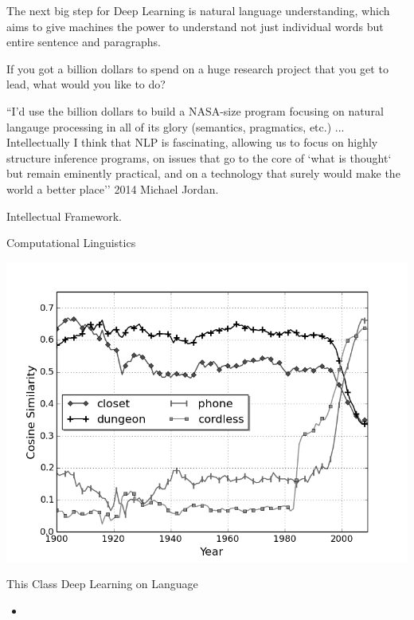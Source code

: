\documentclass{beamer}
\begin{document}
\begin{frame}
  The next big step for Deep Learning is natural language understanding, which aims to give machines the power to understand not just individual words but entire sentence and paragraphs. 
\end{frame}

\begin{frame}
  If you got a billion dollars to spend on a huge research project that you get to lead, what would you like to do? 
  
  ``I'd use the billion dollars to build a NASA-size program focusing on natural langauge processing in all of its glory (semantics, pragmatics, etc.) ... Intellectually I think that NLP is fascinating, allowing us to focus on highly structure inference programs, on issues that go to the core of `what is thought` but remain eminently practical, and on a technology that surely would make the world a better place'' 
  2014 Michael Jordan. 
\end{frame}

\begin{frame}{Intellectual Framework.}
  
\end{frame}

\begin{frame}{Computational Linguistics}
  
\end{frame}


\begin{frame}
  \includegraphics[width=\textwidth]{cell}
\end{frame}
\begin{frame}{This Class}
  Deep Learning on Language 

  \begin{itemize}
  \item 
  \end{itemize}
  
\end{frame}
\end{document}
